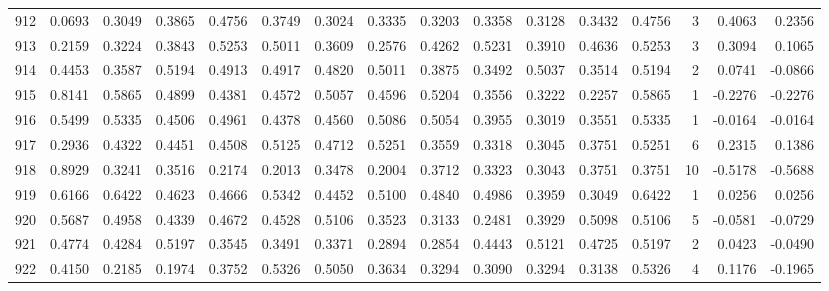 \begin{tabular}{lrrrrrrrrrrrrrrr}
912 &      0.0693 &  0.3049 &  0.3865 &  0.4756 &  0.3749 &  0.3024 &  0.3335 &  0.3203 &  0.3358 &  0.3128 &   0.3432 &     0.4756 &      3 &                    0.4063 &                     0.2356 \\
913 &      0.2159 &  0.3224 &  0.3843 &  0.5253 &  0.5011 &  0.3609 &  0.2576 &  0.4262 &  0.5231 &  0.3910 &   0.4636 &     0.5253 &      3 &                    0.3094 &                     0.1065 \\
914 &      0.4453 &  0.3587 &  0.5194 &  0.4913 &  0.4917 &  0.4820 &  0.5011 &  0.3875 &  0.3492 &  0.5037 &   0.3514 &     0.5194 &      2 &                    0.0741 &                    -0.0866 \\
915 &      0.8141 &  0.5865 &  0.4899 &  0.4381 &  0.4572 &  0.5057 &  0.4596 &  0.5204 &  0.3556 &  0.3222 &   0.2257 &     0.5865 &      1 &                   -0.2276 &                    -0.2276 \\
916 &      0.5499 &  0.5335 &  0.4506 &  0.4961 &  0.4378 &  0.4560 &  0.5086 &  0.5054 &  0.3955 &  0.3019 &   0.3551 &     0.5335 &      1 &                   -0.0164 &                    -0.0164 \\
917 &      0.2936 &  0.4322 &  0.4451 &  0.4508 &  0.5125 &  0.4712 &  0.5251 &  0.3559 &  0.3318 &  0.3045 &   0.3751 &     0.5251 &      6 &                    0.2315 &                     0.1386 \\
918 &      0.8929 &  0.3241 &  0.3516 &  0.2174 &  0.2013 &  0.3478 &  0.2004 &  0.3712 &  0.3323 &  0.3043 &   0.3751 &     0.3751 &     10 &                   -0.5178 &                    -0.5688 \\
919 &      0.6166 &  0.6422 &  0.4623 &  0.4666 &  0.5342 &  0.4452 &  0.5100 &  0.4840 &  0.4986 &  0.3959 &   0.3049 &     0.6422 &      1 &                    0.0256 &                     0.0256 \\
920 &      0.5687 &  0.4958 &  0.4339 &  0.4672 &  0.4528 &  0.5106 &  0.3523 &  0.3133 &  0.2481 &  0.3929 &   0.5098 &     0.5106 &      5 &                   -0.0581 &                    -0.0729 \\
921 &      0.4774 &  0.4284 &  0.5197 &  0.3545 &  0.3491 &  0.3371 &  0.2894 &  0.2854 &  0.4443 &  0.5121 &   0.4725 &     0.5197 &      2 &                    0.0423 &                    -0.0490 \\
922 &      0.4150 &  0.2185 &  0.1974 &  0.3752 &  0.5326 &  0.5050 &  0.3634 &  0.3294 &  0.3090 &  0.3294 &   0.3138 &     0.5326 &      4 &                    0.1176 &                    -0.1965 \\

\end{tabular}

